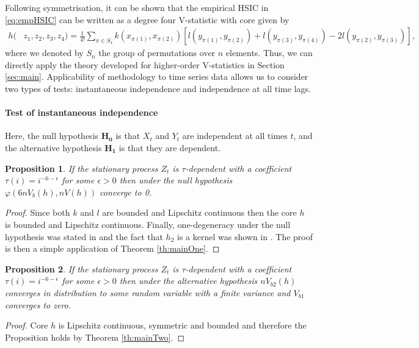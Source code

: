 \documentclass{article} %
\newtheorem{proposition}{Proposition}
\begin{document}
Following symmetrisation, it can be shown that the empirical HSIC in \eqref{eq:empHSIC} can be written as a degree four V-statistic with core given by
\begin{align*}
h(&z_1,z_2,z_3,z_4) = \frac{1}{4!} \sum_{\pi \in S_4}  k(x_{\pi(1)},x_{\pi(2)}) [  l(y_{\pi(1)},y_{\pi(2)}) +  l(y_{\pi(3)},y_{\pi(4)}) - 2  l(y_{\pi(2)},y_{\pi(3)})],  
\end{align*}
where we denoted by $S_n$ the group of permutations over $n$ elements. Thus, we can directly apply the theory developed for higher-order V-statistics in Section \ref{sec:main}. 
Applicability of methodology to time series data allows us to consider two types of tests: instantaneous independence and independence at all time lags.

\paragraph{Test of instantaneous independence}
Here, the null hypothesis  $\mathbf{H_0}$ is that  $X_t$ and $Y_t$ are independent at all times $t$,  and the alternative hypothesis $\mathbf{H_1}$ is that they are dependent. 

\begin{proposition}
\label{prop:null}
If the stationary process $Z_t$ is $\tau$-dependent with a coefficient $\tau(i) = i^{-6-\epsilon}$ for some $\epsilon>0$ then under the null hypothesis $\varphi(6 n V_b(h),n V(h))$ converge to 0. 
\end{proposition}
\begin{proof}
Since both $k$ and $l$ are bounded and Lipschitz continuous then the core $h$ is bounded  and Lipschitz continuous. Finally, one-degeneracy under the null hypothesis was stated in \cite[Theorem 2]{gretton_kernel_2008} and the fact that $h_2$ is a kernel was shown in \cite[section A.2]{gretton_kernel_2008}. The proof is then a simple application of Theorem \ref{th:mainOne}.
\end{proof}

\begin{proposition}
\label{prop:alternative}
If the stationary process $Z_t$ is $\tau$-dependent with a coefficient $\tau(i) = i^{-6-\epsilon}$ for some $\epsilon>0$ then under the alternative hypothesis $n V_{b2}(h)$ converges in distribution to some random variable with a finite variance and $ V_{b1}$ converges to zero. 
\end{proposition}
\begin{proof}
Core $h$ is  Lipschitz continuous, symmetric and bounded and therefore the Proposition holds by Theorem \ref{th:mainTwo}. 
\end{proof}
\end{document}
